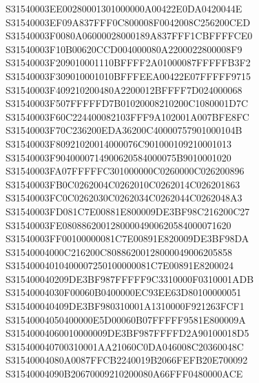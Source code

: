\documentclass[12pt,a4paper]{article}
\begin{document}
\begin{framed}
{S31540003EE00280001301000000A00422E0DA0420044E\newline
S31540003EF09A837FFF0C800008F0042008C256200CED\newline
S31540003F0080A06000028000189A837FFF1CBFFFFCE0\newline
S31540003F10B00620CCD004000080A2200022800008F9\newline
S31540003F209010001110BFFFF2A01000087FFFFFB3F2\newline
S31540003F309010001010BFFFEEA00422E07FFFFF9715\newline
S31540003F409210200480A2200012BFFFF7D024000068\newline
S31540003F507FFFFFD7B01020008210200C1080001D7C\newline
S31540003F60C224400082103FFF9A102001A007BFE8FC\newline
S31540003F70C236200EDA36200C40000757901000104B\newline
S31540003F80921020014000076C901000109210001013\newline
S31540003F9040000714900620584000075B9010001020\newline
S31540003FA07FFFFFC301000000C0260000C026200896\newline
S31540003FB0C0262004C0262010C0262014C026201863\newline
S31540003FC0C0262030C0262034C0262044C0262048A3\newline
S31540003FD081C7E00881E800009DE3BF98C216200C27\newline
S31540003FE08088620012800004900620584000071620\newline
S31540003FF00100000081C7E00891E820009DE3BF98DA\newline
S31540004000C216200C80886200128000049006205858\newline
S31540004010400007250100000081C7E00891E8200024\newline
S315400040209DE3BF987FFFFF9C3310000F0310001ADB\newline
S31540004030F00060B0400000EC93EE63D80100000051\newline
S315400040409DE3BF980310001A1310000F921263FCF1\newline
S31540004050400000E5D00060B07FFFFF9581E800009A\newline
S31540004060010000009DE3BF987FFFFD2A90100018D5\newline
S315400040700310001AA21060C0DA046008C20360048C\newline
S31540004080A0087FFCB2240019B2066FEFB20E700092\newline
S31540004090B20670009210200080A66FFF0480000ACE\newline
}
\end{framed}
\end{document}
